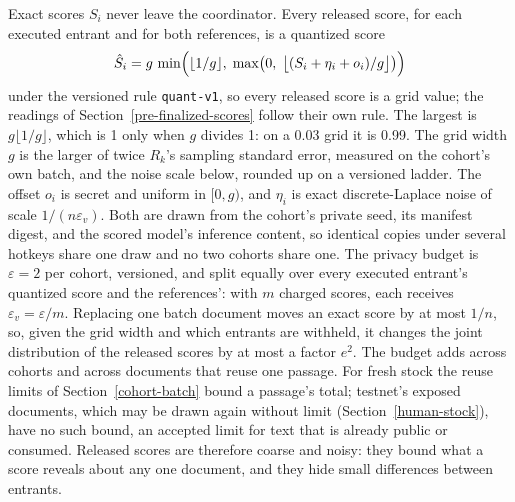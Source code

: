 Exact scores \(S_i\) never leave the coordinator. Every released score, for
each executed entrant and for both references, is a quantized score
\[
 \hat S_i=g\,\min\Bigl(\lfloor 1/g\rfloor,\;\max\bigl(0,\;\bigl\lfloor(S_i+\eta_i+o_i)/g\bigr\rfloor\bigr)\Bigr)
\]
under the versioned rule \texttt{quant-v1}, so every released score is a grid
value; the readings of Section~\ref{pre-finalized-scores} follow their own
rule. The largest is \(g\lfloor 1/g\rfloor\), which is 1 only when \(g\)
divides 1: on a 0.03 grid it is 0.99. The grid width \(g\) is the larger
of twice \(R_k\)'s sampling standard error, measured on the cohort's own batch,
and the noise scale below, rounded up on a versioned ladder. The offset \(o_i\)
is secret and uniform in \([0,g)\), and \(\eta_i\) is exact discrete-Laplace
noise of scale \(1/(n\varepsilon_v)\). Both are drawn from the cohort's private
seed, its manifest digest, and the scored model's inference content, so
identical copies under several hotkeys share one draw and no two cohorts share
one. The privacy budget is \(\varepsilon=2\) per cohort, versioned, and split
equally over every executed entrant's quantized score and the references': with
\(m\) charged scores, each receives \(\varepsilon_v=\varepsilon/m\). Replacing
one batch document moves an exact score by at most \(1/n\), so, given the grid
width and which entrants are withheld, it changes the joint distribution of the
released scores by at most a factor \(e^{2}\). The budget adds across cohorts
and across documents that reuse one passage. For fresh stock the reuse limits
of Section~\ref{cohort-batch} bound a passage's total; testnet's exposed
documents, which may be drawn again without limit
(Section~\ref{human-stock}), have no such bound, an accepted limit for text
that is already public or consumed. Released scores are
therefore coarse and noisy: they bound what a score reveals about any one
document, and they hide small differences between entrants.

